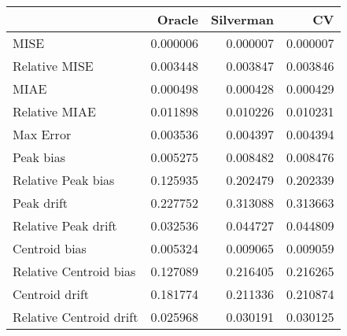 \begin{tabular}{lrrr}
  \hline
 & Oracle & Silverman & CV \\ 
  \hline
MISE & 0.000006 & 0.000007 & 0.000007 \\ 
  Relative MISE & 0.003448 & 0.003847 & 0.003846 \\ 
  MIAE & 0.000498 & 0.000428 & 0.000429 \\ 
  Relative MIAE & 0.011898 & 0.010226 & 0.010231 \\ 
  Max Error & 0.003536 & 0.004397 & 0.004394 \\ 
  Peak bias & 0.005275 & 0.008482 & 0.008476 \\ 
  Relative Peak bias & 0.125935 & 0.202479 & 0.202339 \\ 
  Peak drift & 0.227752 & 0.313088 & 0.313663 \\ 
  Relative Peak drift & 0.032536 & 0.044727 & 0.044809 \\ 
  Centroid bias & 0.005324 & 0.009065 & 0.009059 \\ 
  Relative Centroid bias & 0.127089 & 0.216405 & 0.216265 \\ 
  Centroid drift & 0.181774 & 0.211336 & 0.210874 \\ 
  Relative Centroid drift & 0.025968 & 0.030191 & 0.030125 \\ 
   \hline
\end{tabular}
